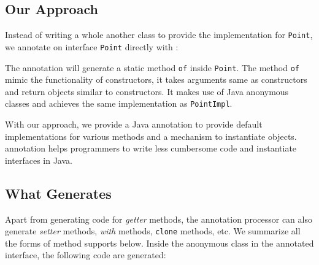 \subsection{Our Approach}
Instead of writing a whole another class to provide the implementation for
\texttt{Point}, we annotate on interface \texttt{Point} directly with \mixin:


The \mixin annotation will generate a static method \texttt{of} inside
\texttt{Point}. The method \texttt{of} mimic the functionality of constructors,
it takes arguments same as constructors and return objects similar to
constructors. It makes use of Java anonymous classes and achieves the same
implementation as \texttt{PointImpl}. 

With our approach, we provide a Java annotation \mixin to provide default
implementations for various methods and a mechanism to instantiate
objects. \mixin annotation helps programmers to write less cumbersome code and
instantiate interfaces in Java. 


\subsection{What  \mixin Generates}
Apart from generating code for \emph{getter} methods, the annotation processor
can also generate \emph{setter} methods, \emph{with} methods, \texttt{clone}
methods, etc. We summarize all the forms of method \mixin  supports below. Inside
the anonymous class in the annotated interface, the following code are
generated:

